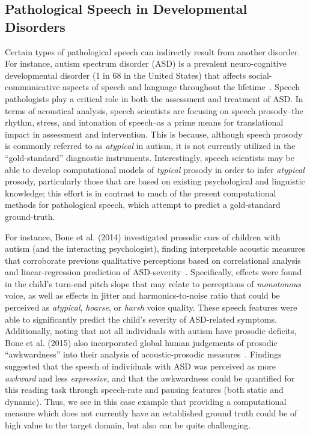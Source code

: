 \documentclass{article}
\begin{document}
\subsection{Pathological Speech in Developmental Disorders}
Certain types of pathological speech can indirectly result from another disorder. For instance, autism spectrum disorder (ASD) is a prevalent neuro-cognitive developmental disorder (1 in 68 in the United States) that affects social-communicative aspects of speech and language throughout the lifetime~\cite{american2013diagnostic}. 
Speech pathologists play a critical role in both the assessment and treatment of ASD. In terms of acoustical analysis, speech scientists are focusing on speech prosody--the rhythm, stress, and intonation of speech--as a prime means for translational impact in assessment and intervention. This is because, although speech prosody is commonly referred to as {\it atypical} in autism, it is not currently utilized in the ``gold-standard'' diagnostic instruments. Interestingly, speech scientists may be able to develop computational models of {\it typical} prosody in order to infer {\it atypical} prosody, particularly those that are based on existing psychological and linguistic knowledge; this effort is in contrast to much of the present computational methods for pathological speech, which attempt to predict a gold-standard ground-truth.

For instance, Bone et al. (2014) investigated prosodic cues of children with autism (and the interacting psychologist), finding interpretable acoustic measures that corroborate previous qualitative perceptions based on correlational analysis and linear-regression prediction of ASD-severity~\cite{bone2014psychologist}. Specifically, effects were found in the child's turn-end pitch slope that may relate to perceptions of {\it monotonous} voice, as well as effects in jitter and harmonics-to-noise ratio that could be perceived as {\it atypical}, {\it hoarse}, or {\it harsh} voice quality. These speech features were able to significantly predict the child's severity of ASD-related symptoms. Additionally, noting that not all individuals with autism have prosodic deficits, Bone et al. (2015) also incorporated global human judgements of prosodic ``awkwardness'' into their analysis of acoustic-prosodic measures~\cite{bone2015acoustic}. Findings suggested that the speech of individuals with ASD was perceived as more {\it awkward} and less {\it expressive}, and that the awkwardness could be quantified for this reading task through speech-rate and pausing features (both static and dynamic). Thus, we see in this case example that providing a computational measure which does not currently have an established ground truth  could be of high value to the target domain, but also can be quite challenging.
\end{document}
